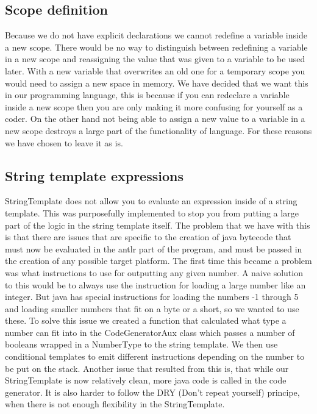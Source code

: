 \documentclass[paper=a4, fontsize=11pt]{article}
\numberwithin{equation}{section}		%
\numberwithin{figure}{section}			%
\numberwithin{table}{section}				%
\begin{document}
\subsection{Scope definition}
Because we do not have explicit declarations we cannot redefine a variable inside a new scope. There would be no way to distinguish between redefining a variable in a new scope and reassigning the value that was given to a variable to be used later. With a new variable that overwrites an old one for a temporary scope you would need to assign a new space in memory. We have decided that we want this in our programming language, this is because if you can redeclare a variable inside a new scope then you are only making it more confusing for yourself as a coder. On the other hand not being able to assign a new value to a variable in a new scope destroys a large part of the functionality of language. For these reasons we have chosen to leave it as is.

\subsection{String template expressions}
StringTemplate does not allow you to evaluate an expression inside of a string template. This was purposefully implemented to stop you from putting a large part of the logic in the string template itself. The problem that we have with this is that there are issues that are specific to the creation of java bytecode that must now be evaluated in the antlr part of the program, and must be passed in the creation of any possible target platform. The first time this became a problem was what instructions to use for outputting any given number. A naive solution to this would be to always use the instruction for loading a large number like an integer. But java has special instructions for loading the numbers -1 through 5 and loading smaller numbers that fit on a byte or a short, so we wanted to use these. To solve this issue we created a function that calculated what type a number can fit into in the CodeGeneratorAux class which passes a number of booleans wrapped in a NumberType to the string template. We then use conditional templates to emit different instructions depending on the number to be put on the stack. Another issue that resulted from this is, that while our StringTemplate is now relatively clean, more java code is called in the code generator. It is also harder to follow the DRY (Don't repeat yourself) principe, when there is not enough flexibility in the StringTemplate.
\end{document}
